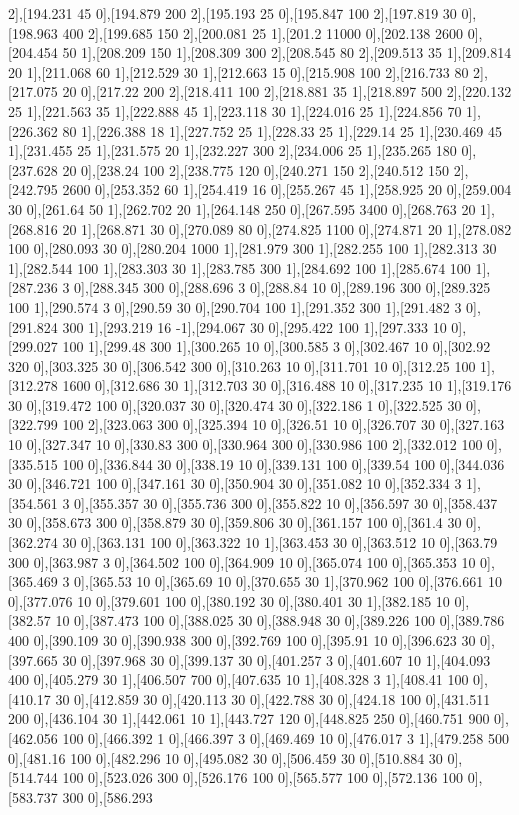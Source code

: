 {2],[194.231 45 0],[194.879 200 2],[195.193 25 0],[195.847 100 2],[197.819 30 0],[198.963 400 2],[199.685 150 2],[200.081 25 1],[201.2 11000 0],[202.138 2600 0],[204.454 50 1],[208.209 150 1],[208.309 300 2],[208.545 80 2],[209.513 35 1],[209.814 20 1],[211.068 60 1],[212.529 30 1],[212.663 15 0],[215.908 100 2],[216.733 80 2],[217.075 20 0],[217.22 200 2],[218.411 100 2],[218.881 35 1],[218.897 500 2],[220.132 25 1],[221.563 35 1],[222.888 45 1],[223.118 30 1],[224.016 25 1],[224.856 70 1],[226.362 80 1],[226.388 18 1],[227.752 25 1],[228.33 25 1],[229.14 25 1],[230.469 45 1],[231.455 25 1],[231.575 20 1],[232.227 300 2],[234.006 25 1],[235.265 180 0],[237.628 20 0],[238.24 100 2],[238.775 120 0],[240.271 150 2],[240.512 150 2],[242.795 2600 0],[253.352 60 1],[254.419 16 0],[255.267 45 1],[258.925 20 0],[259.004 30 0],[261.64 50 1],[262.702 20 1],[264.148 250 0],[267.595 3400 0],[268.763 20 1],[268.816 20 1],[268.871 30 0],[270.089 80 0],[274.825 1100 0],[274.871 20 1],[278.082 100 0],[280.093 30 0],[280.204 1000 1],[281.979 300 1],[282.255 100 1],[282.313 30 1],[282.544 100 1],[283.303 30 1],[283.785 300 1],[284.692 100 1],[285.674 100 1],[287.236 3 0],[288.345 300 0],[288.696 3 0],[288.84 10 0],[289.196 300 0],[289.325 100 1],[290.574 3 0],[290.59 30 0],[290.704 100 1],[291.352 300 1],[291.482 3 0],[291.824 300 1],[293.219 16 -1],[294.067 30 0],[295.422 100 1],[297.333 10 0],[299.027 100 1],[299.48 300 1],[300.265 10 0],[300.585 3 0],[302.467 10 0],[302.92 320 0],[303.325 30 0],[306.542 300 0],[310.263 10 0],[311.701 10 0],[312.25 100 1],[312.278 1600 0],[312.686 30 1],[312.703 30 0],[316.488 10 0],[317.235 10 1],[319.176 30 0],[319.472 100 0],[320.037 30 0],[320.474 30 0],[322.186 1 0],[322.525 30 0],[322.799 100 2],[323.063 300 0],[325.394 10 0],[326.51 10 0],[326.707 30 0],[327.163 10 0],[327.347 10 0],[330.83 300 0],[330.964 300 0],[330.986 100 2],[332.012 100 0],[335.515 100 0],[336.844 30 0],[338.19 10 0],[339.131 100 0],[339.54 100 0],[344.036 30 0],[346.721 100 0],[347.161 30 0],[350.904 30 0],[351.082 10 0],[352.334 3 1],[354.561 3 0],[355.357 30 0],[355.736 300 0],[355.822 10 0],[356.597 30 0],[358.437 30 0],[358.673 300 0],[358.879 30 0],[359.806 30 0],[361.157 100 0],[361.4 30 0],[362.274 30 0],[363.131 100 0],[363.322 10 1],[363.453 30 0],[363.512 10 0],[363.79 300 0],[363.987 3 0],[364.502 100 0],[364.909 10 0],[365.074 100 0],[365.353 10 0],[365.469 3 0],[365.53 10 0],[365.69 10 0],[370.655 30 1],[370.962 100 0],[376.661 10 0],[377.076 10 0],[379.601 100 0],[380.192 30 0],[380.401 30 1],[382.185 10 0],[382.57 10 0],[387.473 100 0],[388.025 30 0],[388.948 30 0],[389.226 100 0],[389.786 400 0],[390.109 30 0],[390.938 300 0],[392.769 100 0],[395.91 10 0],[396.623 30 0],[397.665 30 0],[397.968 30 0],[399.137 30 0],[401.257 3 0],[401.607 10 1],[404.093 400 0],[405.279 30 1],[406.507 700 0],[407.635 10 1],[408.328 3 1],[408.41 100 0],[410.17 30 0],[412.859 30 0],[420.113 30 0],[422.788 30 0],[424.18 100 0],[431.511 200 0],[436.104 30 1],[442.061 10 1],[443.727 120 0],[448.825 250 0],[460.751 900 0],[462.056 100 0],[466.392 1 0],[466.397 3 0],[469.469 10 0],[476.017 3 1],[479.258 500 0],[481.16 100 0],[482.296 10 0],[495.082 30 0],[506.459 30 0],[510.884 30 0],[514.744 100 0],[523.026 300 0],[526.176 100 0],[565.577 100 0],[572.136 100 0],[583.737 300 0],[586.293 }
